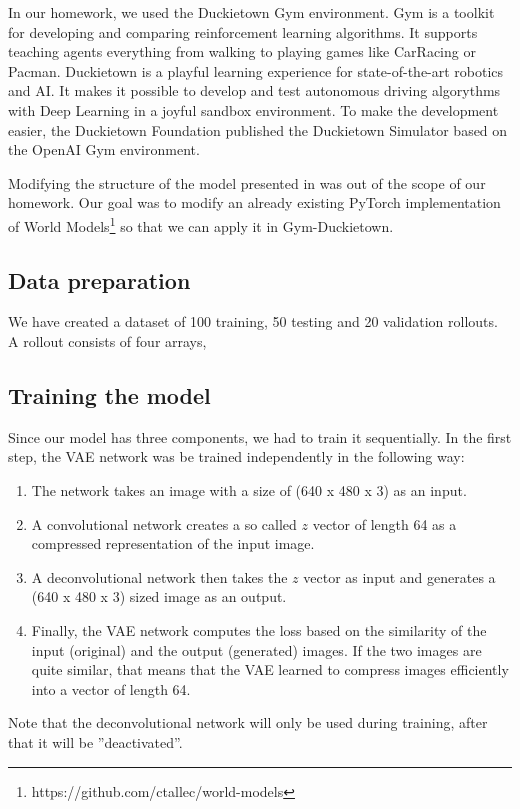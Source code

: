 \documentclass{article}
\begin{document}
In our homework, we used the Duckietown Gym \cite{gym_duckietown} environment. Gym \cite{gym} is a toolkit for developing and comparing reinforcement learning algorithms. It supports teaching agents everything from walking to playing games like CarRacing or Pacman. Duckietown is a playful learning experience for state-of-the-art robotics and AI. It makes it possible to develop and test autonomous driving algorythms with Deep Learning in a joyful sandbox environment. To make the development easier, the Duckietown Foundation published the Duckietown Simulator based on the OpenAI Gym environment.

Modifying the structure of the model presented in \cite{worldmodels} was out of the scope of our homework. Our goal was to modify an already existing PyTorch implementation of World Models\footnote{https://github.com/ctallec/world-models} so that we can apply it in Gym-Duckietown.

\subsection{Data preparation}
We have created a dataset of 100 training, 50 testing and 20 validation rollouts. A rollout consists of four arrays, 

\subsection{Training the model}
Since our model has three components, we had to train it sequentially. In the first step, the VAE network was be trained independently in the following way:
\begin{enumerate}
    \item The network takes an image with a size of (640 x 480 x 3) as an input.
    \item A convolutional network creates a so called $z$ vector of length 64 as a compressed representation of the input image.
    \item A deconvolutional network then takes the $z$ vector as input and generates a (640 x 480 x 3) sized image as an output.
    \item Finally, the VAE network computes the loss based on the similarity of the input (original) and the output (generated) images. If the two images are quite similar, that means that the VAE learned to compress images efficiently into a vector of length 64.
\end{enumerate}

Note that the deconvolutional network will only be used during training, after that it will be ''deactivated''.
\end{document}
